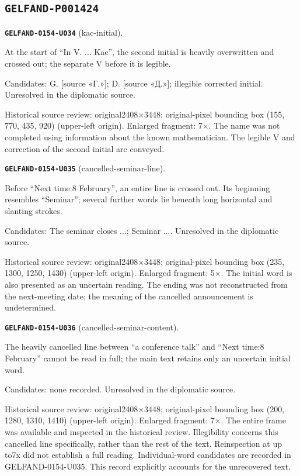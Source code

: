 \subsection*{\texttt{GELFAND-P001424}}
\par\noindent\leavevmode{}\label{GELFAND-0154-U034}\textbf{\texttt{GELFAND-0154-U034}} (kac-initial).\nopagebreak[4]\par
At the start of “In V. ... Kac”, the second initial is heavily overwritten and crossed out; the separate V before it is legible.\par
Candidates: G. [source «Г.»]; D. [source «Д.»]; illegible corrected initial. Unresolved in the diplomatic source.\par
Historical source review: original2408×3448; original-pixel bounding box (155, 770, 435, 920) (upper-left origin). Enlarged fragment: 7×. The name was not completed using information about the known mathematician. The legible V and correction of the second initial are conveyed.\par\medskip
\par\noindent\leavevmode{}\label{GELFAND-0154-U035}\textbf{\texttt{GELFAND-0154-U035}} (cancelled-seminar-line).\nopagebreak[4]\par
Before “Next time:8 February”, an entire line is crossed out. Its beginning resembles “Seminar”; several further words lie beneath long horizontal and slanting strokes.\par
Candidates: The seminar closes ...; Seminar .... Unresolved in the diplomatic source.\par
Historical source review: original2408×3448; original-pixel bounding box (235, 1300, 1250, 1430) (upper-left origin). Enlarged fragment: 5×. The initial word is also presented as an uncertain reading. The ending was not reconstructed from the next-meeting date; the meaning of the cancelled announcement is undetermined.\par\medskip
\par\noindent\leavevmode{}\label{GELFAND-0154-U036}\textbf{\texttt{GELFAND-0154-U036}} (cancelled-seminar-content).\nopagebreak[4]\par
The heavily cancelled line between “a conference talk” and “Next time:8 February” cannot be read in full; the main text retains only an uncertain initial word.\par
Candidates: none recorded. Unresolved in the diplomatic source.\par
Historical source review: original2408×3448; original-pixel bounding box (200, 1280, 1310, 1410) (upper-left origin). Enlarged fragment: 7×. The entire frame was available and inspected in the historical review. Illegibility concerns this cancelled line specifically, rather than the rest of the text. Reinspection at up to7x did not establish a full reading. Individual-word candidates are recorded in GELFAND-0154-U035. This record explicitly accounts for the unrecovered text.\par\medskip
